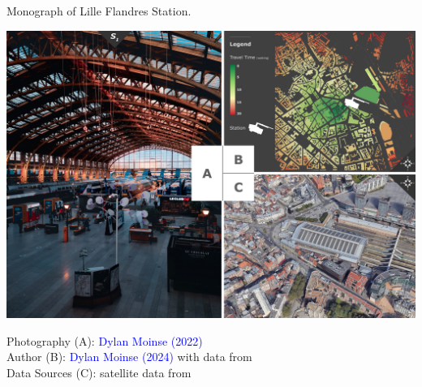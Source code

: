 \begin{refsegment}
    \begin{carte}[h!]\vspace*{4pt}
    \caption{Monograph of Lille Flandres Station.}
    \label{fig-chap3:monographie-lille-flandres}
    \centerline{\includegraphics[height=.35\pageheight]{src/Figures/Chap-3/EN_Gare_Lille_Flandres}}
    \vspace{5pt}
    \begin{flushright}\scriptsize{
    Photography (A): \textcolor{blue}{Dylan Moinse (2022)}
    \\
    Author (B): \textcolor{blue}{Dylan Moinse (2024)} with data from \textcolor{blue}{\textcite{openstreetmap_openstreetmap_2023}}
    \\
    Data Sources (C): satellite data from \textcolor{blue}{\textcite{google_earth_google_2023}}
    }\end{flushright}
    \end{carte}


\end{refsegment}
